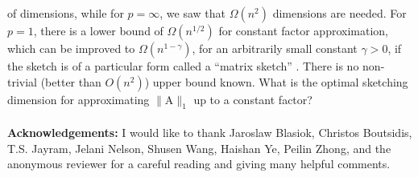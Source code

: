\documentclass[11pt]{article}
\newcommand{\mat}[1]{{\ensuremath{\bm{\mathrm{#1}}}}}
\def\matA{\mat{A}}
\begin{document}
of dimensions, while for $p = \infty$, we saw that $\Omega(n^2)$ dimensions 
are needed. For $p = 1$, there is a lower bound of $\Omega(n^{1/2})$ for
constant factor approximation, which can be improved to $\Omega(n^{1-\gamma})$,
for an arbitrarily small constant $\gamma > 0$, 
if the sketch is of a particular form called a ``matrix sketch'' 
\cite{lnw14}. There is no non-trivial (better than $O(n^2)$) upper bound
known. What is the optimal sketching dimension for approximating
$\|\matA\|_1$ up to a constant factor?
\\\\
{\bf Acknowledgements:} 
I would like to thank Jaroslaw Blasiok, Christos Boutsidis, 
T.S. Jayram, Jelani Nelson, Shusen Wang, Haishan Ye, Peilin Zhong,  
and the anonymous
reviewer for a careful reading and giving many helpful comments. 




\end{document}
